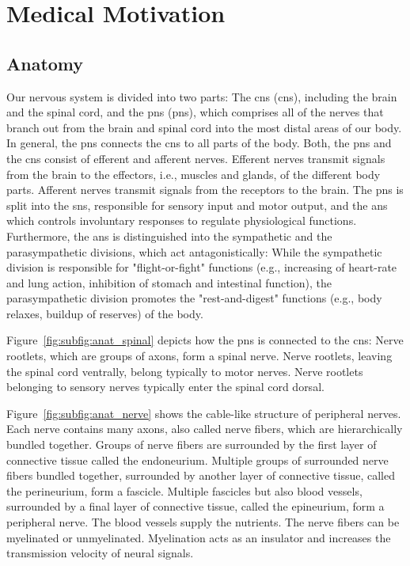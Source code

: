 \section{Medical Motivation} \label{sec:intro_medical} %
\subsection{Anatomy}
Our nervous system is divided into two parts: The \acrlong{cns} (\acrshort{cns}), including the brain and the spinal cord, and the \acrlong{pns} (\acrshort{pns}), which comprises all of the nerves that branch out from the brain and spinal cord into the most distal areas of our body. In general, the \gls{pns} connects the \gls{cns} to all parts of the body. Both, the \gls{pns} and the \gls{cns} consist of efferent and afferent nerves. Efferent nerves transmit signals from the brain to the effectors, i.e., muscles and glands, of the different body parts. Afferent nerves transmit signals from the receptors to the brain. The \gls{pns} is split into the \gls{sns}, responsible for sensory input and motor output, and the \gls{ans} which controls involuntary responses to regulate physiological functions. Furthermore, the \gls{ans} is distinguished into the sympathetic and the parasympathetic divisions, which act antagonistically: While the sympathetic division is responsible for "flight-or-fight" functions (e.g., increasing of heart-rate and lung action, inhibition of stomach and intestinal function), the parasympathetic division promotes the "rest-and-digest" functions (e.g., body relaxes, buildup of reserves) of the body.

Figure~\ref{fig:subfig:anat_spinal} depicts how the \gls{pns} is connected to the \gls{cns}: Nerve rootlets, which are groups of axons, form a spinal nerve. Nerve rootlets, leaving the spinal cord ventrally, belong typically to motor nerves. Nerve rootlets belonging to sensory nerves typically enter the spinal cord dorsal.

Figure~\ref{fig:subfig:anat_nerve} shows the cable-like structure of peripheral nerves. Each nerve contains many axons, also called nerve fibers, which are hierarchically bundled together. Groups of nerve fibers are surrounded by the first layer of connective tissue called the endoneurium. Multiple groups of surrounded nerve fibers bundled together, surrounded by another layer of connective tissue, called the perineurium, form a fascicle. Multiple fascicles but also blood vessels, surrounded by a final layer of connective tissue, called the epineurium, form a peripheral nerve. The blood vessels supply the nutrients. The nerve fibers can be myelinated or unmyelinated. Myelination acts as an insulator and increases the transmission velocity of neural signals.

